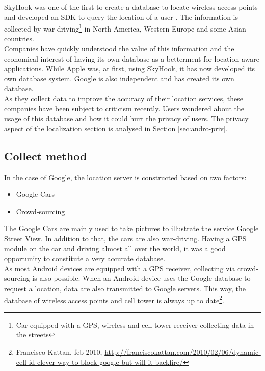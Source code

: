 SkyHook was one of the first to create a database to locate wireless access points and developed an SDK to query the location of a user .
The information is collected by war-driving\footnote{Car equipped with a GPS, wireless and cell tower receiver collecting data in the streets} in North America, Western Europe and some Asian countries\cite{skyhook-coverage}.\\

Companies have quickly understood the value of this information and the economical interest of having its own database as a betterment for location aware applications.
While Apple was, at first, using SkyHook, it has now developed its own database system.
Google is also independent and has created its own database.\\

As they collect data to improve the accuracy of their location services, these companies have been subject to criticism recently.
Users wondered about the usage of this database and how it could hurt the privacy of users.
The privacy aspect of the localization section is analysed in Section \ref{sec:andro-priv}.

\subsection{Collect method}
In the case of Google, the location server is constructed based on two factors:
\begin{itemize}
\item Google Cars
\item Crowd-sourcing
\end{itemize}

The Google Cars are mainly used to take pictures to illustrate the service Google Street View.
In addition to that, the cars are also war-driving.
Having a GPS module on the car and driving almost all over the world, it was a good opportunity to constitute a very accurate database.\\

As most Android devices are equipped with a GPS receiver, collecting via crowd-sourcing is also possible.
When an Android device uses the Google database to request a location, data are also transmitted to Google servers.
This way, the database of wireless access points and cell tower is always up to date\footnote{Francisco Kattan, feb 2010, \url{http://franciscokattan.com/2010/02/06/dynamic-cell-id-clever-way-to-block-google-but-will-it-backfire/}}.


